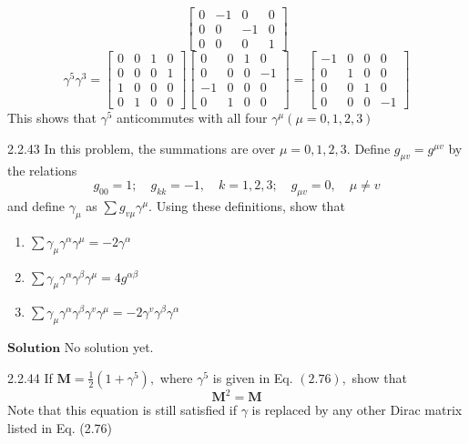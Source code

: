 \documentclass{article}
\begin{document}
\begin{flushleft}
$$\begin{bmatrix}
0 & -1 & 0 & 0 \\
0 & 0 & -1 & 0 \\
0 & 0 & 0 & 1
\end{bmatrix}
$$
$$
\gamma^{5} \gamma^{3}=\begin{bmatrix}
0 & 0 & 1 & 0 \\
0 & 0 & 0 & 1 \\
1 & 0 & 0 & 0 \\
0 & 1 & 0 & 0
\end{bmatrix}\begin{bmatrix}
0 & 0 & 1 & 0 \\
0 & 0 & 0 & -1 \\
-1 & 0 & 0 & 0 \\
0 & 1 & 0 & 0
\end{bmatrix}=\begin{bmatrix}
-1 & 0 & 0 & 0 \\
0 & 1 & 0 & 0 \\
0 & 0 & 1 & 0 \\
0 & 0 & 0 & -1
\end{bmatrix}
$$
This shows that $\gamma^{5}$ anticommutes with all four $\gamma^{\mu}(\mu=0,1,2,3)$




\begin{mybox}{2.2.43}
In this problem, the summations are over $\mu=0,1,2,3 .$ Define $g_{\mu v}=g^{\mu v}$ by the relations
$$
g_{00}=1 ; \quad g_{k k}=-1, \quad k=1,2,3 ; \quad g_{\mu v}=0, \quad \mu \neq v
$$
and define $\gamma_{\mu}$ as $\sum g_{v \mu} \gamma^{\mu} .$ Using these definitions, show that
\begin{enumerate}[$(a)$]
\item $\sum \gamma_{\mu} \gamma^{\alpha} \gamma^{\mu}=-2 \gamma^{\alpha}$
\item $\sum \gamma_{\mu} \gamma^{\alpha} \gamma^{\beta} \gamma^{\mu}=4 g^{\alpha \beta}$
\item $\sum \gamma_{\mu} \gamma^{\alpha} \gamma^{\beta} \gamma^{v} \gamma^{\mu}=-2 \gamma^{v} \gamma^{\beta} \gamma^{\alpha}$
\end{enumerate}
\end{mybox}

$\boxed{\textbf{Solution}}$ No solution yet.

\begin{mybox}{2.2.44}
If $\mathbf{M}=\frac{1}{2}\left(1+\gamma^{5}\right),$ where $\gamma^{5}$ is given in Eq. $(2.76),$ show that
$$
\mathbf{M}^{2}=\mathbf{M}
$$
Note that this equation is still satisfied if $\gamma$ is replaced by any other Dirac matrix listed in Eq. (2.76) 
\end{mybox}



\end{flushleft}
\end{document}
